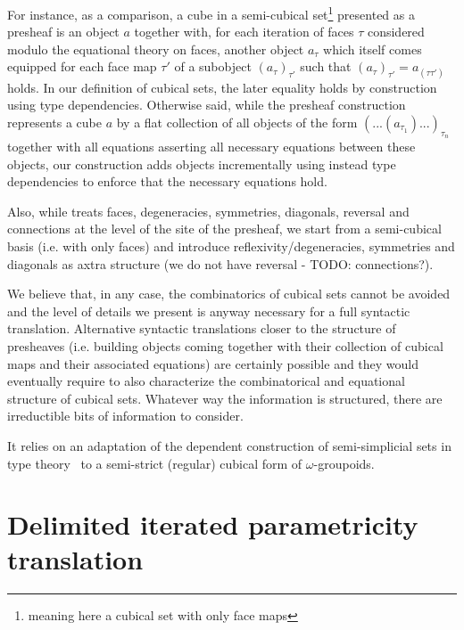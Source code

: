 \documentclass{article}
\begin{document}
\begin{itemize}
\begin{itemize}
   For instance, as a comparison, a cube in a semi-cubical
   set\footnote{meaning here a cubical set with only face maps}
   presented as a presheaf is an object $a$ together with, for each
   iteration of faces $\tau$ considered modulo the equational theory
   on faces, another object $a_{\tau}$ which itself comes equipped for
   each face map $\tau'$ of a subobject $(a_{\tau})_{\tau'}$ such that
   $(a_{\tau})_{\tau'} = a_{(\tau\tau')}$ holds. In our definition of
   cubical sets, the later equality holds by construction using type
   dependencies. Otherwise said, while the presheaf construction
   represents a cube $a$ by a flat collection of all objects of the
   form $(...(a_{\tau_1})...)_{\tau_n}$ together with all equations
   asserting all necessary equations between these objects, our
   construction adds objects incrementally using instead type
   dependencies to enforce that the necessary equations hold.

   Also, while \cite{CohCoqHubMor16} treats faces, degeneracies,
   symmetries, diagonals, reversal and connections at the level of the
   site of the presheaf, we start from a semi-cubical basis (i.e. with
   only faces) and introduce reflexivity/degeneracies, symmetries and
   diagonals as axtra structure (we do not have reversal - TODO:
   connections?).

   We believe that, in any case, the combinatorics of cubical sets
   cannot be avoided and the level of details we present is anyway
   necessary for a full syntactic translation. Alternative syntactic
   translations closer to the structure of presheaves (i.e. building
   objects coming together with their collection of cubical maps and
   their associated equations) are certainly possible and they would
   eventually require to also characterize the combinatorical and
   equational structure of cubical sets. Whatever way the
   information is structured, there are irreductible bits of
   information to consider.
 \end{itemize}
\end{itemize}

It relies on an adaptation of the dependent construction of
semi-simplicial sets in type theory~\cite{Herbelin14} to a semi-strict
(regular) cubical form of $\omega$-groupoids.

\section{Delimited iterated parametricity translation}
\end{document}
